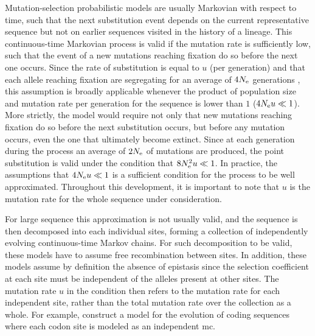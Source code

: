 Mutation-selection probabilistic models are usually Markovian with respect to time, such that the next \gls{substitution} event depends on the current representative sequence but not on earlier sequences visited in the history of a lineage.
This continuous-time Markovian process is valid if the mutation rate is sufficiently low, such that the event of a new mutations reaching fixation do so before the next one occurs. 
Since the rate of \gls{substitution} is equal to $u$ (per generation) and that each \gls{allele} reaching fixation are segregating for an average of $4 N_{\textrm{e}}$ generations \citep{Kimura1969}, this assumption is broadly applicable whenever the product of population size and mutation rate per generation for the sequence is lower than $1$ ($4 N_{\textrm{e}} u \ll 1$).
More strictly, the model would require not only that new mutations reaching fixation do so before the next \gls{substitution} occurs, but before any mutation occurs, even the one that ultimately become extinct.
Since at each generation during the process an average of $2N_{\textrm{e}}$ of mutations are produced, the point \gls{substitution} is valid under the condition that $8N_{\textrm{e}}^2 u \ll 1$.
In practice, the assumptions that $4 N_{\textrm{e}} u \ll 1$ is a sufficient condition for the process to be well approximated.
Throughout this development, it is important to note that $u$ is the mutation rate for the whole sequence under consideration.

For large sequence this approximation is not usually valid, and the sequence is then decomposed into each individual sites, forming a collection of independently evolving continuous-time Markov chains.
For such decomposition to be valid, these models have to assume free \gls{recombination} between sites.
In addition, these models assume by definition the absence of epistasis since the selection coefficient at each site must be independent of the alleles present at other sites. 
The mutation rate $u$ in the condition then refers to the mutation rate for each independent site, rather than the total mutation rate over the collection as a whole.
For example, \citet{Halpern1998} construct a model for the evolution of coding sequences where each \gls{codon} site is modeled as an independent \gls{mc}. 

